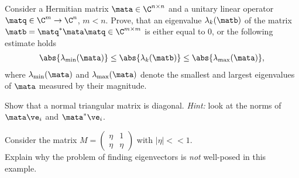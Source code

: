 
\begin{Sheet}
  \label{sheet3}
   
  \begin{Problem}
    Consider a Hermitian matrix $\mata\in\C^{n\times n}$ and a unitary
    linear operator $\matq\in\C^m\to\C^n$, $m<n$. Prove, that an
    eigenvalue $\lambda_k(\matb)$ of the matrix
    $\matb=\matq^*\mata\matq\in\C^{m\times m}$ is either equal to 0,
    or the following estimate holds
    \begin{gather*}
      \abs{\lambda_{\min}(\mata)}
      \leq \abs{\lambda_{k}(\matb)}
      \leq \abs{\lambda_{\max}(\mata)},
    \end{gather*}
    where $\lambda_{\min}(\mata)$ and $\lambda_{\max}(\mata)$ denote
    the smallest and largest eigenvalues of $\mata$ measured by their
    magnitude.
  \end{Problem}

  \begin{Problem}
  	Show that a normal triangular matrix is diagonal. \textit{Hint:}
  	look at the norms of $\mata \ve_i$ and $\mata^*\ve_i$.
  \end{Problem}


  \begin{Problem}
  	Consider the matrix $M = \begin{pmatrix}
  	\eta & 1\\
  	\eta &\eta
  	\end{pmatrix}$ with $|\eta| << 1$.\\
  	Explain why the problem of finding eigenvectors is \textit{not} well-posed in this example.
  \end{Problem}


\end{Sheet}
